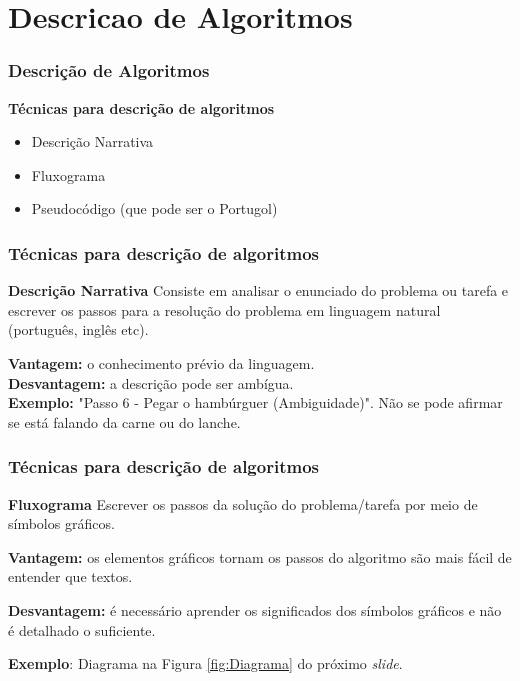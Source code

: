 \section{Descricao de Algoritmos}

\begin{frame}
	\frametitle{Descrição de Algoritmos}
	\textbf{Técnicas para descrição de algoritmos}
	\begin{itemize}
		\item Descrição Narrativa
		\item Fluxograma
		\item Pseudocódigo (que pode ser o Portugol)
	\end{itemize}
\end{frame}



\begin{frame}
	\frametitle{Técnicas para descrição de algoritmos}
	
	\begin{block}{\textbf{Descrição Narrativa}}
		Consiste em analisar o enunciado do problema ou tarefa e escrever os passos para a resolução do problema em linguagem natural (português, inglês etc).
	\end{block}
	
	\textbf{Vantagem:} o conhecimento prévio da linguagem.\\
	
	\textbf{Desvantagem:} a descrição pode ser ambígua.\\
	
	\textbf{Exemplo:} "Passo 6 - Pegar o hambúrguer \alert{(Ambiguidade)}". Não se pode afirmar se está falando da carne ou do lanche.
\end{frame}




\begin{frame}
	\frametitle{Técnicas para descrição de algoritmos}
	
	\begin{block}{\textbf{Fluxograma}}
		Escrever os passos da solução do problema/tarefa por meio de símbolos gráficos.
	\end{block}
	
	\textbf{Vantagem:} os elementos gráficos tornam os passos do algoritmo são mais fácil de entender que textos.
	
	\textbf{Desvantagem:} é necessário aprender os significados dos símbolos gráficos e não é detalhado o suficiente.
	
	\textbf{Exemplo}: Diagrama na Figura \ref{fig:Diagrama} do próximo \textit{slide}.
\end{frame}




